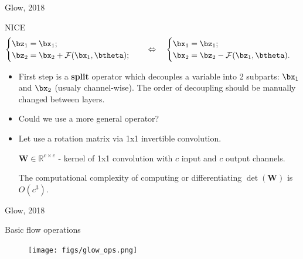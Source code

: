 \begin{frame}{Glow, 2018}
	
	\begin{block}{NICE}
		\vspace{-0.2cm}
		\begin{equation*}
			\begin{cases} \bz_1 = \bx_1; \\ \bz_2 = \bx_2 + \mathcal{F}(\bx_1, \btheta);\end{cases}  \quad \Leftrightarrow \quad 
			\begin{cases} \bx_1 = \bz_1; \\ \bx_2 = \bz_2 - \mathcal{F}(\bz_1, \btheta).\end{cases} 
		\end{equation*}
		\vspace{-0.2cm}
	\end{block}
	\begin{itemize}
	\item First step is a \textbf{split} operator which decouples a variable into 2 subparts: $\bx_1$ and $\bx_2$ (usualy channel-wise).
	The order of decoupling should be manually changed between layers.
	\item Could we use a more general operator?
	\item Let use a rotation matrix via 1x1 invertible convolution.
	
	$\mathbf{W} \in \mathbb{R}^{c \times c}$ - kernel of 1x1 convolution with $c$ input and $c$ output channels.
	
	The computational complexity of computing or differentiating $\det (\mathbf{W})$ is $O(c^3)$.
	\end{itemize}

\end{frame}
\begin{frame}{Glow, 2018}
	\begin{block}{Basic flow operations}
		\begin{figure}
			\centering
			\texttt{[image: figs/glow\_ops.png]}
		\end{figure}
	\end{block}
\end{frame}
